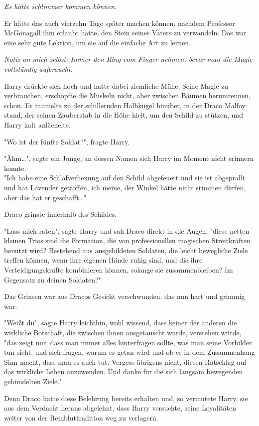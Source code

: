 {\emph{Es hätte schlimmer kommen können.}

Er hätte das auch vierzehn Tage später machen können, nachdem Professor McGonagall ihm erlaubt hatte, den Stein seines Vaters zu verwandeln. Das war eine sehr gute Lektion, um sie auf die einfache Art zu lernen.

\emph{Notiz an mich selbst: Immer den Ring vom Finger nehmen, bevor man die Magie vollständig aufbraucht.}

Harry drückte sich hoch und hatte dabei ziemliche Mühe. Seine Magie zu verbrauchen, erschöpfte die Muskeln nicht, aber zwischen Bäumen herumrennen, schon. Er taumelte zu der schillernden Halbkugel hinüber, in der Draco Malfoy stand, der seinen Zauberstab in die Höhe hielt, um den Schild zu stützen, und Harry kalt anlächelte.

"Wo ist der fünfte Soldat?", fragte Harry.

"Ähm…", sagte ein Junge, an dessen Namen sich Harry im Moment nicht erinnern konnte.\\ "Ich habe eine Schlafverhexung auf den Schild abgefeuert und sie ist abgeprallt und hat Lavender getroffen, ich meine, der Winkel hätte nicht stimmen dürfen, aber das hat er geschafft…"

Draco grinste innerhalb des Schildes.

"Lass mich raten", sagte Harry und sah Draco direkt in die Augen, "diese netten kleinen Trios sind die Formation, die von professionellen magischen Streitkräften benutzt wird? Bestehend aus ausgebildeten Soldaten, die leicht bewegliche Ziele treffen können, wenn ihre eigenen Hände ruhig sind, und die ihre Verteidigungskräfte kombinieren können, solange sie zusammenbleiben? Im Gegensatz zu deinen Soldaten?"

Das Grinsen war aus Dracos Gesicht verschwunden, das nun hart und grimmig war.

"Weißt du", sagte Harry leichthin, wohl wissend, dass keiner der anderen die wirkliche Botschaft, die zwischen ihnen ausgetauscht wurde, verstehen würde, "das zeigt nur, dass man immer alles hinterfragen sollte, was man seine Vorbilder tun sieht, und sich fragen, warum es getan wird und ob es in dem Zusammenhang Sinn macht, dass man es auch tut. Vergess übrigens nicht, diesen Ratschlag auf das wirkliche Leben anzuwenden. Und danke für die sich langsam bewegenden gebündelten Ziele."

Denn Draco hatte diese Belehrung bereits erhalten und, so vermutete Harry, sie aus dem Verdacht heraus abgelehnt, dass Harry versuchte, seine Loyalitäten weiter von der Reinbluttradition weg zu verlagern.

}
